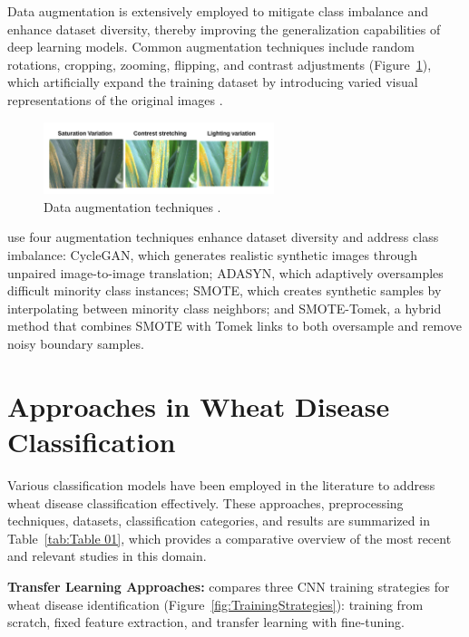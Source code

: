 Data augmentation is extensively employed to mitigate class imbalance and enhance dataset diversity, thereby improving the generalization capabilities of deep learning models. Common augmentation techniques include random rotations, cropping, zooming, flipping, and contrast adjustments (Figure~\ref{fig:Dataaugmentation}), which artificially expand the training dataset by introducing varied visual representations of the original images \parencite{nagpal2024hybrid,hassan2024wheat,nigam2023deep}.

\begin{figure}[H] %
    \centering
    \includegraphics[width=0.6\textwidth]{chapters/chapter3/images/Figure02.png}
    \caption{Data augmentation techniques \parencite{nagpal2024hybrid}.}
    \label{fig:Dataaugmentation}
\end{figure}

\parencite{ramadan2024improving} use four augmentation techniques enhance dataset diversity and address class imbalance: CycleGAN, which generates realistic synthetic images through unpaired image-to-image translation; ADASYN, which adaptively oversamples difficult minority class instances; SMOTE, which creates synthetic samples by interpolating between minority class neighbors; and SMOTE-Tomek, a hybrid method that combines SMOTE with Tomek links to both oversample and remove noisy boundary samples.




\section{Approaches in Wheat Disease Classification}

Various classification models have been employed in the literature to address wheat disease classification effectively. These approaches, preprocessing techniques, datasets, classification categories, and results are summarized in Table~\ref{tab:Table 01}, which provides a comparative overview of the most recent and relevant studies in this domain.

\textbf{Transfer Learning Approaches:} \parencite{jiang2022evaluation} compares three CNN training strategies for wheat disease identification (Figure~\ref{fig:TrainingStrategies}): training from scratch, fixed feature extraction, and transfer learning with fine-tuning.

